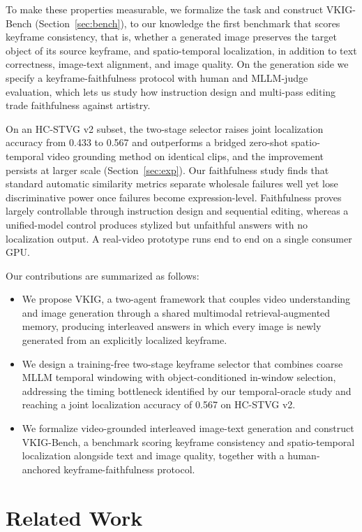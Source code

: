 \documentclass[10pt]{article}
\begin{document}
To make these properties measurable, we formalize the task and construct
VKIG-Bench (Section~\ref{sec:bench}), to our knowledge the first benchmark
that scores keyframe consistency, that is, whether a generated image
preserves the target object of its source keyframe, and spatio-temporal
localization, in addition to text correctness, image-text alignment, and
image quality.
On the generation side we specify a keyframe-faithfulness protocol with human
and MLLM-judge evaluation, which lets us study how instruction design and
multi-pass editing trade faithfulness against artistry.

On an HC-STVG v2 subset, the two-stage selector raises joint localization
accuracy from 0.433 to 0.567 and outperforms a bridged zero-shot
spatio-temporal video grounding method \citep{zeroshotstvg2509} on identical
clips, and the improvement persists at larger scale
(Section~\ref{sec:exp}).
Our faithfulness study finds that standard automatic similarity metrics
separate wholesale failures well yet lose discriminative power once failures
become expression-level.
Faithfulness proves largely controllable through instruction design and
sequential editing, whereas a unified-model control produces stylized but
unfaithful answers with no localization output.
A real-video prototype runs end to end on a single consumer GPU.

Our contributions are summarized as follows:
\begin{itemize}
\item We propose VKIG, a two-agent framework that couples video understanding
and image generation through a shared multimodal retrieval-augmented memory,
producing interleaved answers in which every image is newly generated from an
explicitly localized keyframe.
\item We design a training-free two-stage keyframe selector that combines
coarse MLLM temporal windowing with object-conditioned in-window selection,
addressing the timing bottleneck identified by our temporal-oracle study and
reaching a joint localization accuracy of 0.567 on HC-STVG v2.
\item We formalize video-grounded interleaved image-text generation and
construct VKIG-Bench, a benchmark scoring keyframe consistency and
spatio-temporal localization alongside text and image quality, together with
a human-anchored keyframe-faithfulness protocol.
\end{itemize}


\section{Related Work}
\label{sec:related}
\end{document}
